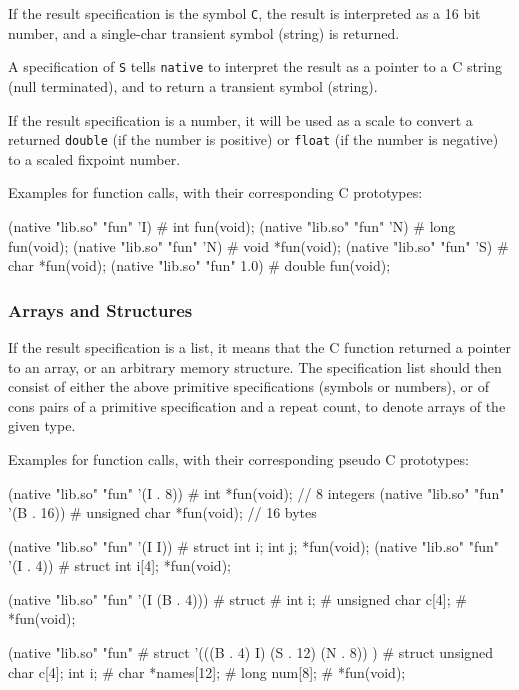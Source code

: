 If the result specification is the symbol \texttt{C}, the result is
interpreted as a 16 bit number, and a single-char transient symbol
(string) is returned.

A specification of \texttt{S} tells \texttt{native} to interpret the
result as a pointer to a C string (null terminated), and to return a
transient symbol (string).

If the result specification is a number, it will be used as a scale to
convert a returned \texttt{double} (if the number is positive) or
\texttt{float} (if the number is negative) to a scaled fixpoint number.

Examples for function calls, with their corresponding C prototypes:

\begin{wideverbatim}
(native "lib.so" "fun" 'I)             # int fun(void);
(native "lib.so" "fun" 'N)             # long fun(void);
(native "lib.so" "fun" 'N)             # void *fun(void);
(native "lib.so" "fun" 'S)             # char *fun(void);
(native "lib.so" "fun" 1.0)            # double fun(void);
\end{wideverbatim}

\subsubsection{Arrays and Structures}
\label{sec:native-arrays-and-structures}

If the result specification is a list, it means that the C function
returned a pointer to an array, or an arbitrary memory structure. The
specification list should then consist of either the above primitive
specifications (symbols or numbers), or of cons pairs of a primitive
specification and a repeat count, to denote arrays of the given type.

Examples for function calls, with their corresponding pseudo C
prototypes:

\begin{wideverbatim}
(native "lib.so" "fun" '(I . 8))       # int *fun(void);  // 8 integers
(native "lib.so" "fun" '(B . 16))      # unsigned char *fun(void);  // 16 bytes

(native "lib.so" "fun" '(I I))         # struct {int i; int j;} *fun(void);
(native "lib.so" "fun" '(I . 4))       # struct {int i[4];} *fun(void);

(native "lib.so" "fun" '(I (B . 4)))   # struct {
                                       #    int i;
                                       #    unsigned char c[4];
                                       # } *fun(void);

(native "lib.so" "fun"                 # struct {
   '(((B . 4) I) (S . 12) (N . 8)) )   #    struct {unsigned char c[4]; int i;}
                                       #    char *names[12];
                                       #    long num[8];
                                       # } *fun(void);
\end{wideverbatim}

